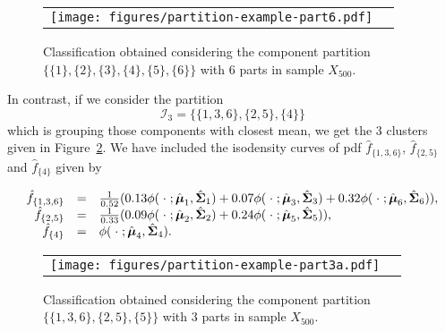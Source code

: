 \documentclass[10pt, a4paper]{article}
\newcommand{\m}[1]{\boldsymbol{#1}}
\begin{document}


\begin{figure}[!h]
\begin{center}
\begin{tabular}{cc}
  \texttt{[image: figures/partition-example-part6.pdf]} \\
 \end{tabular}
 \caption{Classification obtained considering the component partition $\{ \{1\}, \{2\}, \{3\}, \{4\}, \{5\}, \{6\} \}$ with 6 parts in sample $X_{500}$.}\label{ex_part6}
\end{center}
\end{figure}

In contrast, if we consider the partition
\[\mathcal{I}_3 = \{\{1, 3, 6\},\{2, 5\},\{4\}\}\]
which is grouping those components with closest mean, we get the 3 clusters given in Figure~\ref{ex_part3a}. We have included the isodensity curves of pdf $\hat{f}_{\{1,3,6\}}$, $\hat{f}_{\{2, 5\}}$ and $\hat{f}_{\{4\}}$ given by

\[ 
\begin{array}{r c l}
\hat{f}_{\{1,3,6\}} & = & \frac{1}{0.52}(0.13 \phi(\;\cdot\; ; \hat{\m\mu}_1, \hat{\m\Sigma}_1) + 0.07 \phi(\;\cdot\; ; \hat{\m\mu}_3, \hat{\m\Sigma}_3) + 0.32 \phi(\;\cdot\; ; \hat{\m\mu}_6, \hat{\m\Sigma}_6)), \\
\hat{f}_{\{2, 5\}} & = &  \frac{1}{0.33}(0.09 \phi(\;\cdot\; ; \hat{\m\mu}_2, \hat{\m\Sigma}_2) + 0.24 \phi(\;\cdot\; ; \hat{\m\mu}_5, \hat{\m\Sigma}_5)), \\
\hat{f}_{\{4\}} & = &\phi(\;\cdot\; ; \hat{\m\mu}_4, \hat{\m\Sigma}_4).
\end{array} 
\]
  


\begin{figure}[!h]
\begin{center}
\begin{tabular}{cc}
  \texttt{[image: figures/partition-example-part3a.pdf]} \\
 \end{tabular}
 \caption{Classification obtained considering the component partition $\{\{1, 3, 6 \}, \{2, 5\}, \{5\}\}$ with 3 parts in sample $X_{500}$.}\label{ex_part3a}
\end{center}
\end{figure}
\end{document}
